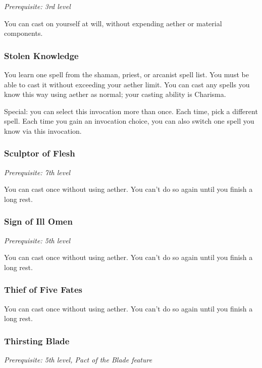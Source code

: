 \textit{Prerequisite: 3rd level}

You can cast  on yourself at will, without expending aether or material components.

\subsubsection{Stolen Knowledge}

You learn one spell from the shaman, priest, or arcanist spell list. You must be able to cast it without exceeding your aether limit. You can cast any spells you know this way using aether as normal; your casting ability is Charisma.

Special: you can select this invocation more than once. Each time, pick a different spell. Each time you gain an invocation choice, you can also switch one spell you know via this invocation.

\subsubsection{Sculptor of Flesh}

\textit{Prerequisite: 7th level}

You can cast  once without using aether. You can't do so again until you finish a long rest.

\subsubsection{Sign of Ill Omen}

\textit{Prerequisite: 5th level}

You can cast  once without using aether. You can't do so again until you finish a long rest.

\subsubsection{Thief of Five Fates}

You can cast  once without using aether. You can't do so again until you finish a long rest.

\subsubsection{Thirsting Blade}

\textit{Prerequisite: 5th level, Pact of the Blade feature}

